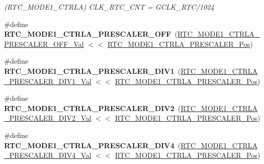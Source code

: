 \begin{DoxyCompactItemize}
\begin{DoxyCompactList}\small\item\em (R\+T\+C\+\_\+\+M\+O\+D\+E1\+\_\+\+C\+T\+R\+L\+A) C\+L\+K\+\_\+\+R\+T\+C\+\_\+\+C\+N\+T = G\+C\+L\+K\+\_\+\+R\+T\+C/1024 \end{DoxyCompactList}\item 
\hypertarget{group___s_a_m_l21___r_t_c_gac4d65fd1c13e6ea3a3a66c4df6198cc4}{}\#define {\bfseries R\+T\+C\+\_\+\+M\+O\+D\+E1\+\_\+\+C\+T\+R\+L\+A\+\_\+\+P\+R\+E\+S\+C\+A\+L\+E\+R\+\_\+\+O\+F\+F}~(\hyperlink{group___s_a_m_l21___r_t_c_gac6f78ba4aa55c531dfd22573b9e2cebc}{R\+T\+C\+\_\+\+M\+O\+D\+E1\+\_\+\+C\+T\+R\+L\+A\+\_\+\+P\+R\+E\+S\+C\+A\+L\+E\+R\+\_\+\+O\+F\+F\+\_\+\+Val} $<$$<$ \hyperlink{group___s_a_m_l21___r_t_c_ga90e26e080dcf46aa7e9f09a8ed02ea7e}{R\+T\+C\+\_\+\+M\+O\+D\+E1\+\_\+\+C\+T\+R\+L\+A\+\_\+\+P\+R\+E\+S\+C\+A\+L\+E\+R\+\_\+\+Pos})\label{group___s_a_m_l21___r_t_c_gac4d65fd1c13e6ea3a3a66c4df6198cc4}

\item 
\hypertarget{group___s_a_m_l21___r_t_c_ga22e740088b1922372b4d8176ba4fdc08}{}\#define {\bfseries R\+T\+C\+\_\+\+M\+O\+D\+E1\+\_\+\+C\+T\+R\+L\+A\+\_\+\+P\+R\+E\+S\+C\+A\+L\+E\+R\+\_\+\+D\+I\+V1}~(\hyperlink{group___s_a_m_l21___r_t_c_ga2ca09a8ded8415bd77a8cef4da165286}{R\+T\+C\+\_\+\+M\+O\+D\+E1\+\_\+\+C\+T\+R\+L\+A\+\_\+\+P\+R\+E\+S\+C\+A\+L\+E\+R\+\_\+\+D\+I\+V1\+\_\+\+Val} $<$$<$ \hyperlink{group___s_a_m_l21___r_t_c_ga90e26e080dcf46aa7e9f09a8ed02ea7e}{R\+T\+C\+\_\+\+M\+O\+D\+E1\+\_\+\+C\+T\+R\+L\+A\+\_\+\+P\+R\+E\+S\+C\+A\+L\+E\+R\+\_\+\+Pos})\label{group___s_a_m_l21___r_t_c_ga22e740088b1922372b4d8176ba4fdc08}

\item 
\hypertarget{group___s_a_m_l21___r_t_c_gaf4aebbd13b222b6dd83290bf4ef6bf79}{}\#define {\bfseries R\+T\+C\+\_\+\+M\+O\+D\+E1\+\_\+\+C\+T\+R\+L\+A\+\_\+\+P\+R\+E\+S\+C\+A\+L\+E\+R\+\_\+\+D\+I\+V2}~(\hyperlink{group___s_a_m_l21___r_t_c_gaec263d559b4e4af4ed131f94fcee777b}{R\+T\+C\+\_\+\+M\+O\+D\+E1\+\_\+\+C\+T\+R\+L\+A\+\_\+\+P\+R\+E\+S\+C\+A\+L\+E\+R\+\_\+\+D\+I\+V2\+\_\+\+Val} $<$$<$ \hyperlink{group___s_a_m_l21___r_t_c_ga90e26e080dcf46aa7e9f09a8ed02ea7e}{R\+T\+C\+\_\+\+M\+O\+D\+E1\+\_\+\+C\+T\+R\+L\+A\+\_\+\+P\+R\+E\+S\+C\+A\+L\+E\+R\+\_\+\+Pos})\label{group___s_a_m_l21___r_t_c_gaf4aebbd13b222b6dd83290bf4ef6bf79}

\item 
\hypertarget{group___s_a_m_l21___r_t_c_gabd8fb695d3371f59fb521430346c7197}{}\#define {\bfseries R\+T\+C\+\_\+\+M\+O\+D\+E1\+\_\+\+C\+T\+R\+L\+A\+\_\+\+P\+R\+E\+S\+C\+A\+L\+E\+R\+\_\+\+D\+I\+V4}~(\hyperlink{group___s_a_m_l21___r_t_c_ga7ef0ca9e6f3f650b96005ab5dce607f9}{R\+T\+C\+\_\+\+M\+O\+D\+E1\+\_\+\+C\+T\+R\+L\+A\+\_\+\+P\+R\+E\+S\+C\+A\+L\+E\+R\+\_\+\+D\+I\+V4\+\_\+\+Val} $<$$<$ \hyperlink{group___s_a_m_l21___r_t_c_ga90e26e080dcf46aa7e9f09a8ed02ea7e}{R\+T\+C\+\_\+\+M\+O\+D\+E1\+\_\+\+C\+T\+R\+L\+A\+\_\+\+P\+R\+E\+S\+C\+A\+L\+E\+R\+\_\+\+Pos})\label{group___s_a_m_l21___r_t_c_gabd8fb695d3371f59fb521430346c7197}


\end{DoxyCompactItemize}
